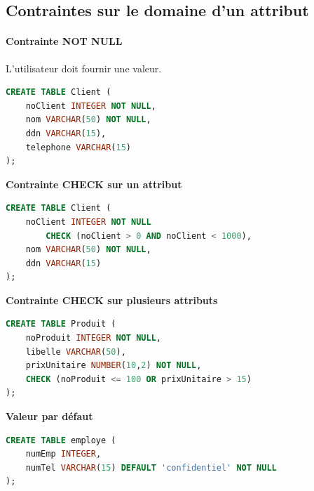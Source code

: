 
\subsection{Contraintes sur le domaine d’un attribut}

\paragraph{Contrainte NOT NULL}

L’utilisateur doit fournir une valeur.

\begin{sqlcodebox}
\begin{lstlisting}[language=SQL]
CREATE TABLE Client (
    noClient INTEGER NOT NULL,
    nom VARCHAR(50) NOT NULL,
    ddn VARCHAR(15),
    telephone VARCHAR(15)
);
\end{lstlisting}
\end{sqlcodebox}

\textbf{Contrainte CHECK sur un attribut}

\begin{sqlcodebox}
\begin{lstlisting}[language=SQL]
CREATE TABLE Client (
    noClient INTEGER NOT NULL
        CHECK (noClient > 0 AND noClient < 1000),
    nom VARCHAR(50) NOT NULL,
    ddn VARCHAR(15)
);
\end{lstlisting}
\end{sqlcodebox}

\textbf{Contrainte CHECK sur plusieurs attributs}

\begin{sqlcodebox}
\begin{lstlisting}[language=SQL]
CREATE TABLE Produit (
    noProduit INTEGER NOT NULL,
    libelle VARCHAR(50),
    prixUnitaire NUMBER(10,2) NOT NULL,
    CHECK (noProduit <= 100 OR prixUnitaire > 15)
);
\end{lstlisting}
\end{sqlcodebox}

\textbf{Valeur par défaut}

\begin{sqlcodebox}
\begin{lstlisting}[language=SQL]
CREATE TABLE employe (
    numEmp INTEGER,
    numTel VARCHAR(15) DEFAULT 'confidentiel' NOT NULL
);
\end{lstlisting}
\end{sqlcodebox}

